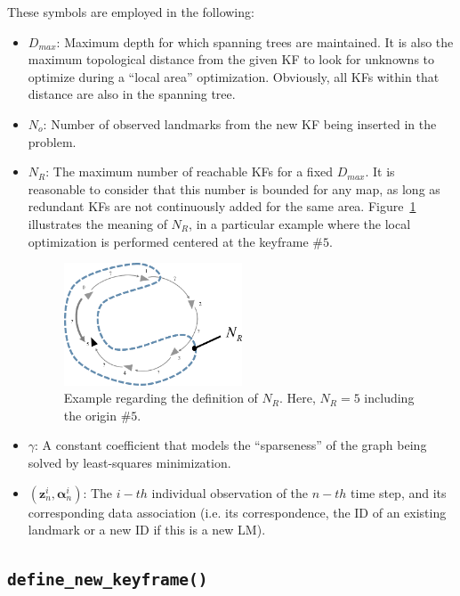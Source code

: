 \documentclass[a4paper,11pt]{article}
\begin{document}
These symbols are employed in the following:

\begin{itemize}
\item{$D_{max}$: Maximum depth for which spanning trees are maintained. It is also the maximum topological distance 
   from the given KF to look for unknowns to optimize during a ``local area'' optimization. Obviously, all KFs within 
   that distance are also in the spanning tree.}
\item{$N_o$: Number of observed landmarks from the new KF being inserted in the problem.}
\item{$N_R$: The maximum number of reachable KFs for a fixed $D_{max}$. It is reasonable to consider that this number 
is bounded for any map, as long as redundant KFs are not continuously added for the same area. 
Figure~\ref{fig:Nr} illustrates the meaning of $N_R$, in a particular example where the local optimization is performed
centered at the keyframe $\#5$.
\begin{figure}[h!]
\centering
\includegraphics[width=0.5\textwidth]{imgs/Nr.pdf} 
\caption{Example regarding the definition of $N_R$. Here, $N_R=5$ including the origin $\#5$.}
\label{fig:Nr}
\end{figure}
}
\item{$\gamma$: A constant coefficient that models the ``sparseness'' of the graph being solved by least-squares minimization.}
\item{$(\mathbf{z}_n^i,\mathbf{\alpha}_n^i)$: The $i-th$ individual observation of the $n-th$ time step, and 
  its corresponding data association (i.e. its correspondence, the ID of an existing landmark or a new ID if this 
  is a new LM).}
\end{itemize}


\newpage
\subsection{\texttt{define\_new\_keyframe()}}
\label{sect:code:define_new_keyframe}
\end{document}
